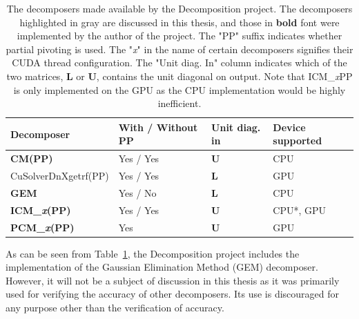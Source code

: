 \begin{table}[ht!]
	\centering
	\begin{tabular}{|l|l|l|l|}
		\hline
		\rowcolor[HTML]{C0C0C0} \textbf{Decomposer}          & \textbf{With / Without PP} & \textbf{Unit diag. in} & \textbf{Device supported} \\ \hline
		\cellcolor[HTML]{EFEFEF}\textbf{CM(PP)}              & Yes / Yes                  & $\mathbf{U}$           & CPU                       \\
		\cellcolor[HTML]{EFEFEF}CuSolverDnXgetrf(PP)         & Yes / Yes                  & $\mathbf{L}$           & GPU                       \\
		\textbf{GEM}                                         & Yes / No                   & $\mathbf{L}$           & CPU                       \\
		\cellcolor[HTML]{EFEFEF}\textbf{ICM\_\textit{x}(PP)} & Yes / Yes                  & $\mathbf{U}$           & CPU*, GPU                 \\
		\cellcolor[HTML]{EFEFEF}\textbf{PCM\_\textit{x}(PP)} & Yes                        & $\mathbf{U}$           & GPU                       \\ \hline
	\end{tabular}
	\caption{The decomposers made available by the Decomposition project. The decomposers highlighted in gray are discussed in this thesis, and those in \textbf{bold} font were implemented by the author of the project. The "PP" suffix indicates whether partial pivoting is used. The "\textit{x}" in the name of certain decomposers signifies their CUDA thread configuration. The "Unit diag. In" column indicates which of the two matrices, $\mathbf{L}$ or $\mathbf{U}$, contains the unit diagonal on output. Note that ICM\_\textit{x}PP is only implemented on the GPU as the CPU implementation would be highly inefficient.}
	\label{Table:implementation->decomposition-project->implemented-solutions->decomposers->decomposers-in-the-project}
\end{table}

As can be seen from Table~\ref{Table:implementation->decomposition-project->implemented-solutions->decomposers->decomposers-in-the-project}, the Decomposition project includes the implementation of the Gaussian Elimination Method (GEM) decomposer. However, it will not be a subject of discussion in this thesis as it was primarily used for verifying the accuracy of other decomposers. Its use is discouraged for any purpose other than the verification of accuracy.

